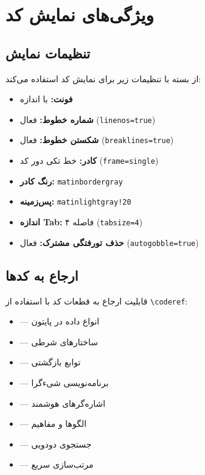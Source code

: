 \documentclass{matinbook}
\begin{document}
    \label{code:quicksort}
    
    \chapter{ویژگی‌های نمایش کد}
    
    \section{تنظیمات نمایش}
    
     از بسته  با تنظیمات زیر
    برای نمایش کد استفاده می‌کند:
    
    \begin{itemize}
        \item \textbf{فونت:}  با اندازه \inlcode{\small}
        \item \textbf{شماره خطوط:} فعال (\texttt{linenos=true})
        \item \textbf{شکستن خطوط:} فعال (\texttt{breaklines=true})
        \item \textbf{کادر:} خط تکی دور کد (\texttt{frame=single})
        \item \textbf{رنگ کادر:} \texttt{matinbordergray}
        \item \textbf{پس‌زمینه:} \texttt{matinlightgray!20}
        \item \textbf{اندازه Tab:} ۴ فاصله (\texttt{tabsize=4})
        \item \textbf{حذف تورفتگی مشترک:} فعال (\texttt{autogobble=true})
    \end{itemize}
    
    \section{ارجاع به کدها}
    
    قابلیت ارجاع به قطعات کد با استفاده از \texttt{\textbackslash coderef}:
    
    \begin{itemize}
        \item {} --- انواع داده در پایتون
        \item {} --- ساختارهای شرطی
        \item {} --- توابع بازگشتی
        \item {} --- برنامه‌نویسی شیءگرا
        \item {} --- اشاره‌گرهای هوشمند 
        \item {} --- الگوها و مفاهیم 
        \item {} --- جستجوی دودویی
        \item {} --- مرتب‌سازی سریع
    \end{itemize}
    
\end{document}
